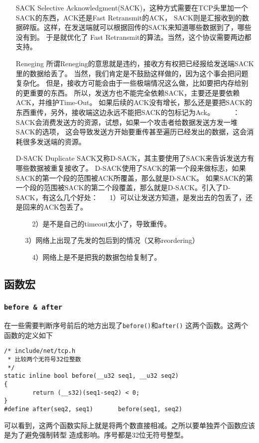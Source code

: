 \begin{enumerate}
\item[SACK]         Selective Acknowledgment(SACK)，这种方式需要在TCP头里加一个SACK的东西，ACK还是Fast Retransmit的ACK，
                    SACK则是汇报收到的数据碎版。这样，在发送端就可以根据回传的SACK来知道哪些数据到了，哪些没有到。
                    于是就优化了 Fast Retransmit的算法。当然，这个协议需要两边都支持。
\item[Reneging]     所谓Reneging的意思就是违约，接收方有权把已经报给发送端SACK里的数据给丢了。
                    当然，我们肯定是不鼓励这样做的，因为这个事会把问题复杂化。
                    但是，接收方可能会由于一些极端情况这么做，比如要把内存给别的更重要的东西。
                    所以，发送方也不能完全依赖SACK，主要还是要依赖ACK，并维护Time-Out。
                    如果后续的ACK没有增长，那么还是要把SACK的东西重传，另外，接收端这边永远不能把SACK的包标记为Ack。
　　                    \color{red}{注意}：SACK会消费发送方的资源，试想，如果一个攻击者给数据发送方发一堆SACK的选项，
                    这会导致发送方开始要重传甚至遍历已经发出的数据，这会消耗很多发送端的资源。

\item[D-SACK]       Duplicate SACK又称D-SACK，其主要使用了SACK来告诉发送方有哪些数据被重复接收了。
                    D-SACK使用了SACK的第一个段来做标志，如果SACK的第一个段的范围被ACK所覆盖，那么就是D-SACK。
                    如果SACK的第一个段的范围被SACK的第二个段覆盖，那么就是D-SACK。引入了D-SACK，有这么几个好处：
　                      1）可以让发送方知道，是发出去的包丢了，还是回来的ACK包丢了。

　　                        2）是不是自己的timeout太小了，导致重传。

　                      3）网络上出现了先发的包后到的情况（又称reordering）

　　                        4）网络上是不是把我的数据包给复制了。
\end{enumerate}
	\subsection{函数宏}
		\subsubsection{\texttt{before & after}}
			在一些需要判断序号前后的地方出现了\texttt{before()}和\texttt{after()}
			这两个函数。这两个函数的定义如下
\begin{verbatim}
/* include/net/tcp.h
 * 比较两个无符号32位整数
 */
static inline bool before(__u32 seq1, __u32 seq2)
{
        return (__s32)(seq1-seq2) < 0;
}
#define after(seq2, seq1)       before(seq1, seq2)
\end{verbatim}
		可以看到，这两个函数实际上就是将两个数直接相减。之所以要单独弄个函数应该是为了避免强制转型
		造成影响。序号都是32位无符号整型。

